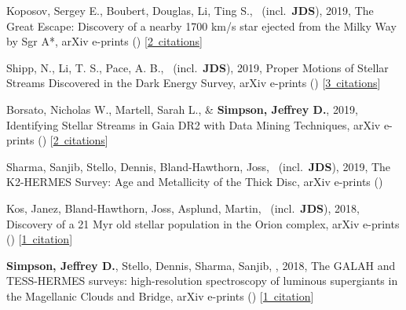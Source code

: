 \item[{\color{numcolor}\scriptsize6}] Koposov, Sergey E., Boubert, Douglas, Li, Ting S., \etal\ (incl.\ \textbf{JDS}), 2019, The Great Escape: Discovery of a nearby 1700 km/s star ejected from the Milky Way by Sgr A*, arXiv e-prints () [\href{https://ui.adsabs.harvard.edu/#abs/2019arXiv190711725K}{2~citations}]

\item[{\color{numcolor}\scriptsize5}] Shipp, N., Li, T. S., Pace, A. B., \etal\ (incl.\ \textbf{JDS}), 2019, Proper Motions of Stellar Streams Discovered in the Dark Energy Survey, arXiv e-prints () [\href{https://ui.adsabs.harvard.edu/#abs/2019arXiv190709488S}{3~citations}]

\item[{\color{numcolor}\scriptsize4}] Borsato, Nicholas W., Martell, Sarah L., \& \textbf{Simpson, Jeffrey D.}, 2019, Identifying Stellar Streams in Gaia DR2 with Data Mining Techniques, arXiv e-prints () [\href{https://ui.adsabs.harvard.edu/#abs/2019arXiv190702527B}{2~citations}]

\item[{\color{numcolor}\scriptsize3}] Sharma, Sanjib, Stello, Dennis, Bland-Hawthorn, Joss, \etal\ (incl.\ \textbf{JDS}), 2019, The K2-HERMES Survey: Age and Metallicity of the Thick Disc, arXiv e-prints ()

\item[{\color{numcolor}\scriptsize2}] Kos, Janez, Bland-Hawthorn, Joss, Asplund, Martin, \etal\ (incl.\ \textbf{JDS}), 2018, Discovery of a 21 Myr old stellar population in the Orion complex, arXiv e-prints () [\href{https://ui.adsabs.harvard.edu/#abs/2018arXiv181111762K}{1~citation}]

\item[{\color{numcolor}\scriptsize1}] \textbf{Simpson, Jeffrey D.}, Stello, Dennis, Sharma, Sanjib, \etal, 2018, The GALAH and TESS-HERMES surveys: high-resolution spectroscopy of luminous supergiants in the Magellanic Clouds and Bridge, arXiv e-prints () [\href{https://ui.adsabs.harvard.edu/#abs/2018arXiv180405900S}{1~citation}]
